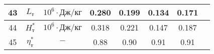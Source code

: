 \begin{landscape}
\begin{center}
\begin{longtable}{|c|c|c|c|c|c|c|c|}
            43 & $L_т$ & $10^6 \cdot Дж/кг$ & 0.280 & 0.199 & 0.134 & 0.171 \\\hline
            
            44 & $H_т^*$ & $10^6 \cdot Дж/кг$ & 0.318 & 0.221 & 0.147 & 0.187 \\\hline
            
            45 & $\eta_т^*$ & $-$ & 0.88 & 0.90 & 0.91 & 0.91 \\\hline
            
        \end{longtable}
    \end{center}
\end{landscape}